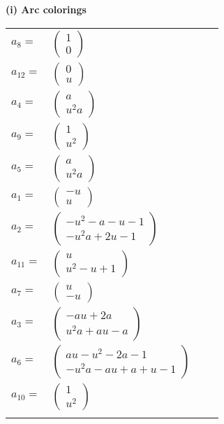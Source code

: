 \documentclass[1p]{elsarticle_modified}
\theoremstyle{definition}
\begin{document}
\flushleft \textbf{(i) Arc colorings}\\
\begin{tabular}{m{7pt} m{180pt} m{7pt} m{180pt} }
\flushright $a_{8}=$&$\begin{pmatrix}1\\0\end{pmatrix}$ \\
\flushright $a_{12}=$&$\begin{pmatrix}0\\u\end{pmatrix}$ \\
\flushright $a_{4}=$&$\begin{pmatrix}a\\u^2 a\end{pmatrix}$ \\
\flushright $a_{9}=$&$\begin{pmatrix}1\\u^2\end{pmatrix}$ \\
\flushright $a_{5}=$&$\begin{pmatrix}a\\u^2 a\end{pmatrix}$ \\
\flushright $a_{1}=$&$\begin{pmatrix}- u\\u\end{pmatrix}$ \\
\flushright $a_{2}=$&$\begin{pmatrix}- u^2- a- u-1\\- u^2 a+2 u-1\end{pmatrix}$ \\
\flushright $a_{11}=$&$\begin{pmatrix}u\\u^2- u+1\end{pmatrix}$ \\
\flushright $a_{7}=$&$\begin{pmatrix}u\\- u\end{pmatrix}$ \\
\flushright $a_{3}=$&$\begin{pmatrix}- a u+2 a\\u^2 a+a u- a\end{pmatrix}$ \\
\flushright $a_{6}=$&$\begin{pmatrix}a u- u^2-2 a-1\\- u^2 a- a u+a+u-1\end{pmatrix}$ \\
\flushright $a_{10}=$&$\begin{pmatrix}1\\u^2\end{pmatrix}$\\&\end{tabular}
\end{document}
